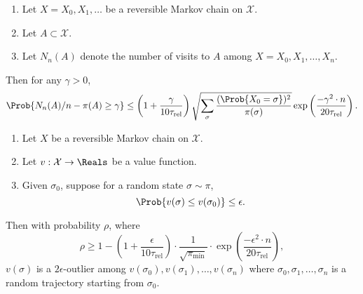 \documentclass[12pt]{article}
\begin{document}
\begin{theorem}
    \label{thm:serialsignificance:gillman}
    \begin{enumerate}
        \item
            Let \( X = X_0, X_1, \dots \) be a reversible Markov chain
            on \( \mathcal{X} \).
        \item
            Let \( A \subset \mathcal{X} \).
        \item
            Let \( N_n(A) \) denote the number of visits to \( A \)
            among \( X = X_0, X_1, \dots, X_n \).
    \end{enumerate}
    Then for any \( \gamma > 0 \),
    \[
        \Prob{N_n(A)/n - \pi(A) \ge \gamma} \le \left( 1 + \frac{\gamma}
        {10 \tau_{\text{rel}}} \right) \sqrt{\sum_{\sigma} \frac{(\Prob{X_0
        = \sigma})^2}{\pi (\sigma)}} \exp \left( \frac{-\gamma^2 \cdot n}
        {20 \tau_{\text{rel}}} \right).
    \]
\end{theorem}

\begin{theorem}
    \label{thm:serialsignificance:powerthm}
    \begin{enumerate}
        \item
            Let \( X \) be a reversible Markov chain on \( \mathcal{X} \).
        \item
            Let \( v :  \mathcal{X} \to \Reals \) be a value function.
        \item
            Given \( \sigma_0 \), suppose for a random state \( \sigma
            \sim \pi \),
            \[
                \Prob{v(\sigma) \le v(\sigma_0)} \le \epsilon.
            \]
    \end{enumerate}
    Then with probability \( \rho \), where
    \[
        \rho \ge 1 - \left( 1 + \frac{\epsilon}{10 \tau_{\text{rel}}}
        \right) \cdot \frac{1}{\sqrt{\pi_{\min}}} \cdot \exp \left(
        \frac {-\epsilon^ {2} \cdot n}{20 \tau_{\text{rel}}} \right),
    \] \( v(\sigma) \) is a \( 2\epsilon \)-outlier among \( v(\sigma_0),
    v(\sigma_1), \dots, v(\sigma_n) \) where \( \sigma_0, \sigma_1,
    \dots, \sigma_n \) is a random trajectory starting from \( \sigma_0 \).
\end{theorem}
\end{document}
